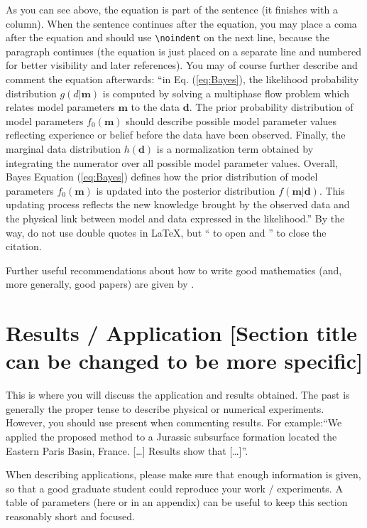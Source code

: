 \documentclass[preprint]{ring}
\begin{document}
\noindent As you can see above, the equation is part of the sentence (it finishes with a column). When the sentence continues after the equation, you may place a coma after the equation and should use \verb|\noindent| on the next line, because the paragraph continues (the equation is just placed on a separate line and numbered for better visibility and later references). You may of course further describe and comment the equation afterwards: ``in Eq. (\ref{eq:Bayes}), the likelihood probability distribution $g(d|\mathbf{m})$ is computed by solving a multiphase flow problem which relates model parameters $\mathbf{m}$ to the data $\mathbf{d}$. The prior probability distribution of model parameters $f_0 (\mathbf{m})$ should describe possible model parameter values reflecting experience or belief before the data have been observed. Finally, the marginal data distribution $h(\mathbf{d})$ is a normalization term obtained by integrating the numerator over all possible model parameter values. Overall, Bayes Equation (\ref{eq:Bayes}) defines how the prior distribution of model parameters $f_0 (\mathbf{m})$ is updated into the posterior distribution $f(\mathbf{m}|\mathbf{d})$. This updating process reflects the new knowledge brought by the observed data and the physical link between model and data expressed in the likelihood.'' By the way, do not use double quotes in  \LaTeX, but `` to open and '' to close the citation. 

Further useful recommendations about how to write good mathematics (and, more generally, good papers) are given by \citet{Lee2010}.

\section{Results / Application [Section title can be changed to be more specific]}
\label{appli}

This is where you will discuss the application and results obtained. The past is generally the proper tense to describe physical or numerical experiments. However, you should use present when commenting results. For example:``We applied the proposed method to a Jurassic subsurface formation located the Eastern Paris Basin, France. […] Results show that […]''.

When describing applications, please make sure that enough information is given, so that a good graduate student could reproduce your work / experiments. A table of parameters (here or in an appendix) can be useful to keep this section reasonably short and focused.
\end{document}
